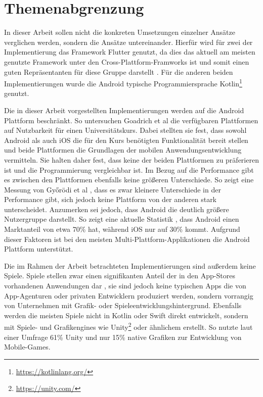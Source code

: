 \section{Themenabgrenzung}
\label{cha:3_3abgrenzung}
In dieser Arbeit sollen nicht die konkreten Umsetzungen einzelner Ansätze verglichen werden, sondern die Ansätze untereinander. Hierfür wird für zwei der Implementierung das Framework Flutter genutzt, da dies das aktuell am meisten genutzte Framework unter den Cross-Plattform-Framworks ist und somit einen guten Repräsentanten für diese Gruppe darstellt \cite{statist_CP_Framework}. Für die anderen beiden Implementierungen wurde die Android typische Programmiersprache Kotlin\footnote{\url{https://kotlinlang.org/}} genutzt. 

Die in dieser Arbeit vorgestellten Implementierungen werden auf die Android Plattform beschränkt. 
So untersuchen Goadrich et al \cite{iOSvsAndroid} die verfügbaren Plattformen auf Nutzbarkeit für einen Universitätskurs. 
Dabei stellten sie  fest, dass sowohl Android als auch iOS die für den Kurs benötigten Funktionalität bereit stellen und beide Plattformen die Grundlagen der mobilen Anwendungsentwicklung vermitteln. Sie halten daher fest, dass keine der beiden Plattformen zu präferieren ist und die Programmierung vergleichbar ist.
Im Bezug auf die Performance gibt es zwischen den Plattformen ebenfalls keine größeren Unterschiede. So zeigt eine Messung von Győrödi et al \cite{Android_IOS_Performance_comparison}, dass es zwar kleinere Unterschiede in der Performance gibt, sich jedoch keine Plattform von der anderen stark unterscheidet.
Anzumerken sei jedoch, dass Android die deutlich größere Nutzergruppe darstellt. So zeigt eine aktuelle Statistik \cite{statist_OS_worldwide}, dass Android einen Marktanteil von etwa 70\% hat, während iOS nur auf 30\% kommt. Aufgrund dieser Faktoren ist bei den meisten Multi-Plattform-Applikationen die Android Plattform unterstützt.

Die im Rahmen der Arbeit betrachteten Implementierungen sind außerdem keine Spiele. Spiele stellen zwar einen signifikanten Anteil der in den App-Stores vorhandenen Anwendungen dar \cite{statist_games_appstore}, sie sind jedoch keine typischen Apps die von App-Agenturen oder privaten Entwicklern produziert werden, sondern vorrangig von Unternehmen mit Grafik- oder Spieleentwicklungshintergrund. Ebenfalls werden die meisten Spiele nicht in Kotlin oder Swift direkt entwickelt, sondern mit Spiele- und Grafikengines wie Unity\footnote{\url{https://unity.com/}} oder ähnlichem erstellt. So nutzte laut einer Umfrage \cite{unity_percantage_game_enginge} 61\% Unity und nur 15\% native Grafiken zur Entwicklung von Mobile-Games.

